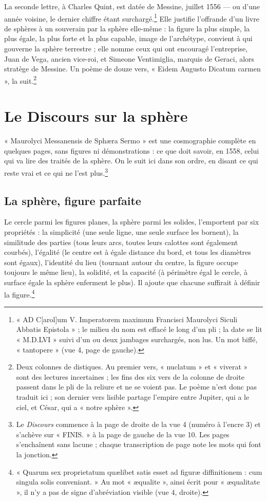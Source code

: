 \documentclass[11pt,a4paper]{article}
\begin{document}
La seconde lettre, à Charles Quint, est datée de Messine, juillet 1556 — ou
d'une année voisine, le dernier chiffre étant surchargé.\footnote{« AD
C[arol]um V. Imperatorem maximum Francisci Maurolyci Siculi Abbatis Epistola » ;
le milieu du nom est effacé le long d'un pli ; la date se lit « M.D.LVI »
suivi d'un ou deux jambages surchargés, non lus. Un mot biffé, « tantopere »
(vue 4, page de gauche).} Elle justifie l'offrande d'un livre de sphères à un
souverain par la sphère elle-même : la figure la plus simple, la plus égale, la
plus forte et la plus capable, image de l'archétype, convient à qui gouverne la
sphère terrestre ; elle nomme ceux qui ont encouragé l'entreprise, Juan de Vega,
ancien vice-roi, et Simeone Ventimiglia, marquis de Geraci, alors stratège de
Messine. Un poème de douze vers, « Eidem Augusto Dicatum carmen », la
suit.\footnote{Deux colonnes de distiques. Au premier vers, « nuclatum » et
« viverat » sont des lectures incertaines ; les fins des six vers de la colonne
de droite passent dans le pli de la reliure et ne se voient pas. Le poème n'est
donc pas traduit ici ; son dernier vers lisible partage l'empire entre Jupiter,
qui a le ciel, et César, qui a « notre sphère ».}

\section*{Le Discours sur la sphère}

« Maurolyci Messanensis de Sphæra Sermo » est une cosmographie complète en
quelques pages, sans figures ni démonstrations : ce que doit savoir, en 1558,
celui qui va lire des traités de la sphère. On le suit ici dans son ordre, en
disant ce qui reste vrai et ce qui ne l'est plus.\footnote{Le \emph{Discours}
commence à la page de droite de la vue 4 (numéro à l'encre 3) et s'achève sur
« FINIS. » à la page de gauche de la vue 10. Les pages s'enchaînent sans lacune ;
chaque transcription de page note les mots qui font la jonction.}

\subsection*{La sphère, figure parfaite}

Le cercle parmi les figures planes, la sphère parmi les solides, l'emportent
par six propriétés : la simplicité (une seule ligne, une seule surface les
bornent), la similitude des parties (tous leurs arcs, toutes leurs calottes
sont également courbés), l'égalité (le centre est à égale distance du bord, et
tous les diamètres sont égaux), l'identité du lieu (tournant autour du centre,
la figure occupe toujours le même lieu), la solidité, et la capacité (à
périmètre égal le cercle, à surface égale la sphère enferment le plus). Il
ajoute que chacune suffirait à définir la figure.\footnote{« Quarum sex
proprietatum quælibet satis esset ad figuræ diffinitionem : cum singula solis
conveniant. » Au mot « æqualite », ainsi écrit pour « æqualitate », il n'y a
pas de signe d'abréviation visible (vue 4, droite).}
\end{document}
